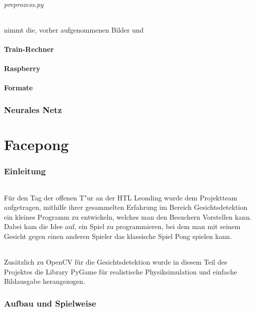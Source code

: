 \documentclass[12pt]{article}
\begin{document}
\paragraph{preprozess.py}
nimmt die, vorher aufgenommenen Bilder und 
\subsection{Train-Rechner}
\subsection{Raspberry}
\subsection{Formate}
\label{formats}

\section{Neurales Netz}


\part{Facepong}
\section{Einleitung}
\paragraph{}
Für den Tag der offenen T"ur an der HTL Leonding wurde dem Projektteam
aufgetragen, mithilfe ihrer gesammelten Erfahrung im Bereich Gesichtsdetektion
ein kleines Programm zu entwickeln, welches man den Besuchern Vorstellen kann.
Dabei kam die Idee auf, ein Spiel zu programmieren, bei dem man mit seinem Gesicht
gegen einen anderen Spieler das klassische Spiel \glqq Pong\grqq{} spielen kann.
\paragraph{}
Zusätzlich zu OpenCV für die Gesichtsdetektion wurde in diesem Teil des Projektes
die Library PyGame für realistische Physiksimulation und einfache Bildausgabe
herangezogen.
\section{Aufbau und Spielweise}
\end{document}
